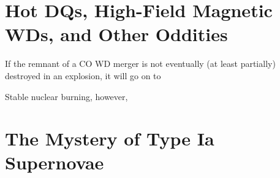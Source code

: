 \section{Hot DQs, High-Field Magnetic WDs, and Other Oddities}

If the remnant of a CO WD merger is not eventually (at least partially) destroyed in an explosion, it will go on to 


Stable nuclear burning, however, 

\section{The Mystery of Type Ia Supernovae}



